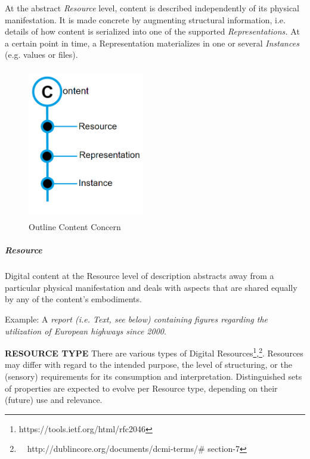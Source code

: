At the abstract \textit{Resource} level, content is described independently of its physical manifestation. It is made concrete by augmenting structural information, i.e. details of how content is serialized into one of the supported \textit{Representations. }At a certain point in time, a Representation materializes in one or several \textit{Instances} (e.g. values or files). \\

\begin{figure}[H]
	\begin{Center}
		\includegraphics[width=2.0in,height=2.61in]{./media/image33.png}
		\caption{Outline Content Concern}
		\label{fig:outline_content_concern}
	\end{Center}
\end{figure}


\subparagraph*{Resource }
Digital content at the Resource level of description abstracts away from a particular physical manifestation and deals with aspects that are shared equally by any of the content’s embodiments. 

Example: A \textit{report (i.e. Text, see below) containing figures regarding the utilization of European highways since 2000}.



\textbf{RESOURCE TYPE} There are various types of Digital Resources\footnote{ https://tools.ietf.org/html/rfc2046 },\footnote{\ \  http://dublincore.org/documents/dcmi-terms/$\#$ section-7 }. Resources may differ with regard to the intended purpose, the level of structuring, or the (sensory) requirements for its consumption and interpretation. Distinguished sets of properties are expected to evolve per Resource type, depending on their (future) use and relevance. 

